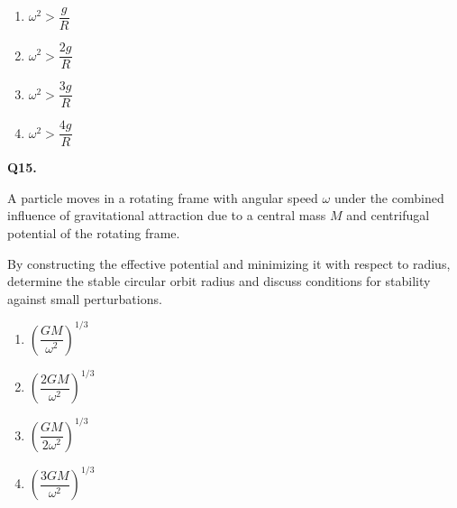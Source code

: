 \documentclass[12pt]{article}
\begin{document}
\begin{enumerate}
\item[(A)] $\omega^2>\dfrac{g}{R}$
\item[(B)] $\omega^2>\dfrac{2g}{R}$
\item[(C)] $\omega^2>\dfrac{3g}{R}$
\item[(D)] $\omega^2>\dfrac{4g}{R}$
\end{enumerate}

\bigskip

\textbf{Q15.}

A particle moves in a rotating frame with angular speed $\omega$ under the combined influence of gravitational attraction due to a central mass $M$ and centrifugal potential of the rotating frame.

By constructing the effective potential and minimizing it with respect to radius, determine the stable circular orbit radius and discuss conditions for stability against small perturbations.

\begin{enumerate}
\item[(A)] $\left(\dfrac{GM}{\omega^2}\right)^{1/3}$
\item[(B)] $\left(\dfrac{2GM}{\omega^2}\right)^{1/3}$
\item[(C)] $\left(\dfrac{GM}{2\omega^2}\right)^{1/3}$
\item[(D)] $\left(\dfrac{3GM}{\omega^2}\right)^{1/3}$
\end{enumerate}
\end{document}
